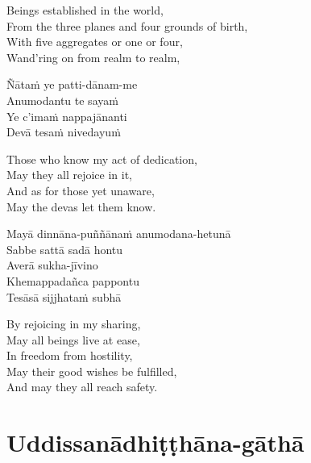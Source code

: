\begin{english}
  Beings established in the world,\\
  From the three planes and four grounds of birth,\\
  With five aggregates or one or four,\\
  Wand'ring on from realm to realm,
\end{english}

Ñātaṁ ye patti-dānam-me\\
Anumodantu te sayaṁ\\
Ye c'imaṁ nappajānanti\\
Devā tesaṁ nivedayuṁ

\begin{english}
  Those who know my act of dedication,\\
  May they all rejoice in it,\\
  And as for those yet unaware,\\
  May the devas let them know.
\end{english}

Mayā dinnāna-puññānaṁ anumodana-hetunā\\
Sabbe sattā sadā hontu\\
Averā sukha-jīvino\\
Khemappadañca pappontu\\
Tesāsā sijjhataṁ subhā

\begin{english}
  By rejoicing in my sharing,\\
  May all beings live at ease,\\
  In freedom from hostility,\\
  May their good wishes be fulfilled,\\
  And may they all reach safety.
\end{english}

\section{Uddissanādhiṭṭhāna-gāthā}

\begin{leader}
\end{leader}


